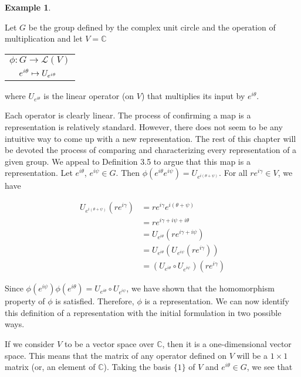 \documentclass[10pt]{ucthesis}
\newtheorem{example}[definition]{Example}
\begin{document}
\begin{example}\end{example}
	Let $G$ be the group defined by the complex unit circle and the operation of multiplication and let $V = \mathbb{C}$ 
	\begin{center}
		 \begin{tabular}{l}$\phi:G\rightarrow \mathcal{L}(V)$\\
				$\hspace{4mm}e^{i\theta}\mapsto U_{e^{i\theta}}$
		\end{tabular}
	\end{center}
	where $U_{e^{i\theta}}$ is the linear operator (on $V$) that multiplies its input by $e^{i\theta}$. 


Each operator is clearly linear. The process of confirming a map is a representation is relatively standard. However, there does not seem to be any intuitive way to come up with a new representation. The rest of this chapter will be devoted the process of comparing and characterizing every representation of a given group. We appeal to Definition 3.5 to argue that this map is a representation. Let $e^{i\theta}$, $e^{i\psi} \in G$. Then $\phi(e^{i\theta} e^{i\psi}) = U_{e^{i(\theta+\psi)}}$. For all $re^{i\gamma} \in V$, we have

	\begin{equation}
		\begin{aligned}
			U_{e^{i(\theta+\psi)}}(re^{i\gamma}) &= re^{i\gamma}  e^{i(\theta+\psi)} \\
										&= re^{i\gamma + i\psi + i\theta} \\
										&= U_{e^{i\theta}}(re^{i\gamma + i\psi}) \\
										&= U_{e^{i\theta}}(U_{e^{i\psi}}(re^{i\gamma})) \\
										&= (U_{e^{i\theta}}\circ U_{e^{i\psi}}) (re^{i\gamma})
		\end{aligned}
	\end{equation}

Since $\phi(e^{i\psi})\phi(e^{i\theta}) = U_{e^{i\theta}}\circ U_{e^{i\psi}}$, we have shown that the homomorphism property of $\phi$ is satisfied. Therefore, $\phi$ is a representation. We can now identify this definition of a representation with the initial formulation in two possible ways.

If we consider $V$ to be a vector space over $\mathbb{C}$, then it is a one-dimensional vector space. This means that the matrix of any operator defined on $V$ will be a $1\times 1$ matrix (or, an element of $\mathbb{C}$). Taking the basis $\{1\}$ of $V$ and $e^{i\theta} \in G$, we see that 
\end{document}
